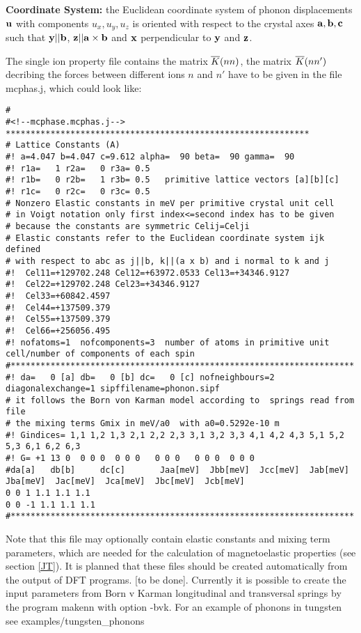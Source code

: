 {\bf Coordinate System:} the Euclidean coordinate system of phonon displacements $\mathbf u$ with
components $u_x,u_y,u_z$ is oriented with respect to the crystal axes $\mathbf a,\mathbf b, \mathbf c$
such that $\mathbf y || \mathbf b$, $\mathbf z || \mathbf a \times \mathbf b $ and $\mathbf x$ perpendicular
to $\mathbf y$ and $\mathbf z$.

The single ion property file contains the matrix $\overline{K}(nn)$, the matrix $\overline{K}(nn')$ decribing the
forces between
different ions $n$ and $n'$ have to be given in the file {\prg mcphas.j}, which could
look like:

\begin{verbatim}
# 
#<!--mcphase.mcphas.j-->
*************************************************************
# Lattice Constants (A)
#! a=4.047 b=4.047 c=9.612 alpha=  90 beta=  90 gamma=  90
#! r1a=   1 r2a=   0 r3a= 0.5
#! r1b=   0 r2b=   1 r3b= 0.5   primitive lattice vectors [a][b][c]
#! r1c=   0 r2c=   0 r3c= 0.5
# Nonzero Elastic constants in meV per primitive crystal unit cell 
# in Voigt notation only first index<=second index has to be given
# because the constants are symmetric Celij=Celji
# Elastic constants refer to the Euclidean coordinate system ijk defined
# with respect to abc as j||b, k||(a x b) and i normal to k and j
#!  Cel11=+129702.248 Cel12=+63972.0533 Cel13=+34346.9127
#!  Cel22=+129702.248 Cel23=+34346.9127
#!  Cel33=+60842.4597
#!  Cel44=+137509.379
#!  Cel55=+137509.379
#!  Cel66=+256056.495
#! nofatoms=1  nofcomponents=3  number of atoms in primitive unit cell/number of components of each spin
#*********************************************************************
#! da=   0 [a] db=   0 [b] dc=   0 [c] nofneighbours=2 diagonalexchange=1 sipffilename=phonon.sipf
# it follows the Born von Karman model according to  springs read from file 
# the mixing terms Gmix in meV/a0  with a0=0.5292e-10 m
#! Gindices= 1,1 1,2 1,3 2,1 2,2 2,3 3,1 3,2 3,3 4,1 4,2 4,3 5,1 5,2 5,3 6,1 6,2 6,3
#! G= +1 13 0  0 0 0  0 0 0   0 0 0   0 0 0  0 0 0
#da[a]   db[b]     dc[c]       Jaa[meV]  Jbb[meV]  Jcc[meV]  Jab[meV]  Jba[meV]  Jac[meV]  Jca[meV]  Jbc[meV]  Jcb[meV]
0 0 1 1.1 1.1 1.1
0 0 -1 1.1 1.1 1.1 
#*********************************************************************
\end{verbatim}

Note that this file may optionally contain elastic constants and mixing
term parameters, which are needed for the calculation
of magnetoelastic properties (see section \ref{JT}).
It is planned that these files should be created automatically from the 
output of DFT programs. [to be done]. Currently it is possible to create 
the input parameters from Born v Karman longitudinal and transversal springs
by the program {\prg makenn} with option {\prg -bvk}.
For an example of phonons in tungsten see {\prg examples/tungsten\_phonons }

